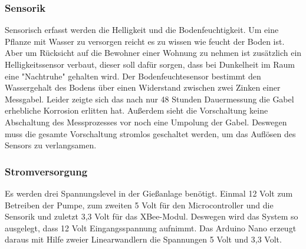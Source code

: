 	\subsubsection{Sensorik}
	Sensorisch erfasst werden die Helligkeit und die Bodenfeuchtigkeit. 
	Um eine Pflanze mit Wasser zu versorgen reicht es zu wissen wie feucht der Boden ist. 
	Aber um Rücksicht auf die Bewohner einer Wohnung zu nehmen ist zusätzlich ein Helligkeitssensor verbaut, dieser soll dafür sorgen, dass bei Dunkelheit im Raum eine "Nachtruhe" gehalten wird.
	Der Bodenfeuchtesensor bestimmt den Wassergehalt des Bodens über einen Widerstand zwischen zwei Zinken einer Messgabel. 
	Leider zeigte sich das nach nur 48 Stunden Dauermessung die Gabel erhebliche Korrosion erlitten hat.
	Außerdem sieht die Vorschaltung keine Abschaltung des Messprozesses vor noch eine Umpolung der Gabel.
	Deswegen muss die gesamte Vorschaltung stromlos geschaltet werden, um das Auflösen des Sensors zu verlangsamen. 
	
	\subsubsection{Stromversorgung}
	Es werden drei Spannungslevel in der Gießanlage benötigt. 
	Einmal 12 Volt zum Betreiben der Pumpe, zum zweiten 5 Volt für den Microcontroller und die Sensorik und  zuletzt  3,3 Volt für das XBee-Modul. 
	Deswegen wird das System so ausgelegt, dass 12 Volt Eingangsspannung aufnimmt. 
	Das Arduino Nano erzeugt daraus mit Hilfe zweier Linearwandlern die Spannungen 5 Volt und 3,3 Volt.
	



